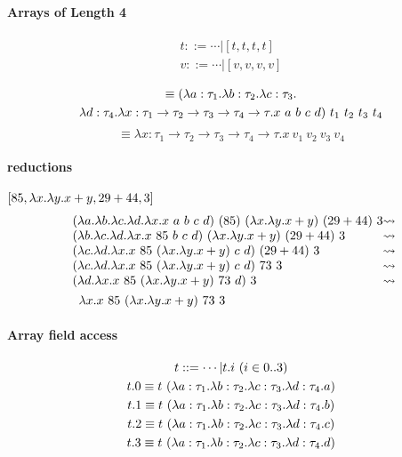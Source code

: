 \documentclass{article}
\newcommand{\lam}[2]{\ensuremath{\lambda#1.#2}}
\begin{document}
\paragraph{Arrays of Length 4}
\begin{gather*}
    t ::= \cdots | [t,t,t,t] \\
    v ::= \cdots | [v,v,v,v] \\
\end{gather*}
\begin{multline*}
    [t_1,t_2,t_3,t_4] \equiv (\lam{a:\tau_1}\lam{b:\tau_2}\lam{c:\tau_3}\\ \lam{d:\tau_4}\lam{x:\tau_1\to\tau_2\to\tau_3\to\tau_4\to\tau}{x\ a\ b\ c\ d})\ t_1\ t_2\ t_3\ t_4
\end{multline*}
\begin{equation*}
    [v_1,v_2,v_3,v_4] \equiv \lam{x:\tau_1\to\tau_2\to\tau_3\to\tau_4\to\tau}{x\ v_1\ v_2\ v_3\ v_4}
\end{equation*}
\paragraph{reductions} $[85, \lam{x}\lam{y}{x+y}, 29+44, 3]$
\begin{align*}
    &\begin{array}{l @{\leadsto}l}
        (\lam{a}\lam{b}\lam{c}\lam{d}\lam{x}{x\ a\ b\ c\ d})\ (85)\ (\lam{x}\lam{y}{x+y})\ (29+44)\ 3 \\
        (\lam{b}\lam{c}\lam{d}\lam{x}{x\ 85\ b\ c\ d})\ (\lam{x}\lam{y}{x+y})\ (29+44)\ 3 \\
        (\lam{c}\lam{d}\lam{x}{x\ 85\ (\lam{x}\lam{y}{x+y})\ c\ d})\ (29+44)\ 3 \\
        (\lam{c}\lam{d}\lam{x}{x\ 85\ (\lam{x}\lam{y}{x+y})\ c\ d})\ 73\ 3 \\
        (\lam{d}\lam{x}{x\ 85\ (\lam{x}\lam{y}{x+y})\ 73\ d})\ 3 \\
    \end{array} \\
        &\quad\lam{x}{x\ 85\ (\lam{x}\lam{y}{x+y})\ 73\ 3}
\end{align*}

\paragraph{Array field access}
\begin{gather*}
    t ::= \cdots | t.i\ (i\in0..3) \\
    t.0 \equiv t\ (\lam{a:\tau_1}\lam{b:\tau_2}\lam{c:\tau_3}\lam{d:\tau_4}{a}) \\
    t.1 \equiv t\ (\lam{a:\tau_1}\lam{b:\tau_2}\lam{c:\tau_3}\lam{d:\tau_4}{b}) \\
    t.2 \equiv t\ (\lam{a:\tau_1}\lam{b:\tau_2}\lam{c:\tau_3}\lam{d:\tau_4}{c}) \\
    t.3 \equiv t\ (\lam{a:\tau_1}\lam{b:\tau_2}\lam{c:\tau_3}\lam{d:\tau_4}{d}) \\
\end{gather*}
\end{document}

